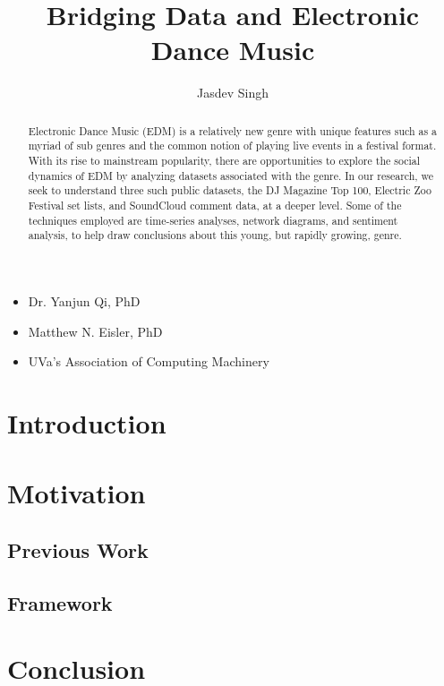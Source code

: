 \documentclass[12pt]{dalcsthesis}
\begin{document}
\mcs 
\title{Bridging Data and Electronic Dance Music}
\author{Jasdev Singh}


\nolistoftables
\nolistoffigures

\frontmatter

\begin{abstract}
Electronic Dance Music (EDM) is a relatively new genre with unique features such as a myriad of sub genres and the common notion of playing live events in a festival format. With its rise to mainstream popularity, there are opportunities to explore the social dynamics of EDM by analyzing datasets associated with the genre. In our research, we seek to understand three such public datasets, the DJ Magazine Top 100, Electric Zoo Festival set lists, and SoundCloud comment data, at a deeper level. Some of the techniques employed are time-series analyses, network diagrams, and sentiment analysis, to help draw conclusions about this young, but rapidly growing, genre.
\end{abstract}

\begin{acknowledgements}
\begin{itemize}
	\item Dr. Yanjun Qi, PhD
	\item Matthew N. Eisler, PhD
	\item UVa's Association of Computing Machinery
\end{itemize}
\end{acknowledgements}

\mainmatter

\chapter{Introduction}

\chapter{Motivation}

\section{Previous Work}

\section{Framework}

\chapter{Conclusion}



\end{document}
